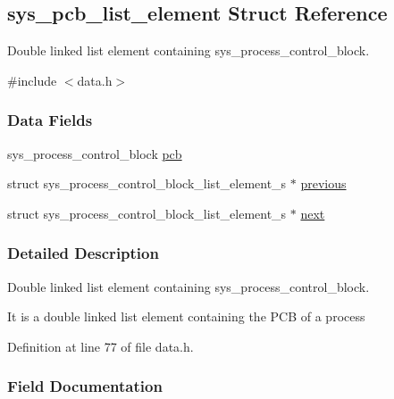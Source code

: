 \hypertarget{structsys__pcb__list__element}{}\subsection{sys\+\_\+pcb\+\_\+list\+\_\+element Struct Reference}
\label{structsys__pcb__list__element}


Double linked list element containing sys\+\_\+process\+\_\+control\+\_\+block.  




{\ttfamily \#include $<$data.\+h$>$}

\subsubsection*{Data Fields}
\begin{DoxyCompactItemize}
\item 
sys\+\_\+process\+\_\+control\+\_\+block \hyperlink{structsys__pcb__list__element_acb5a7246aa5eec849c42eafb63105088}{pcb}
\item 
struct sys\+\_\+process\+\_\+control\+\_\+block\+\_\+list\+\_\+element\+\_\+s $\ast$ \hyperlink{structsys__pcb__list__element_a15f2b704a96be29b91fc99a7c7ed6f83}{previous}
\item 
struct sys\+\_\+process\+\_\+control\+\_\+block\+\_\+list\+\_\+element\+\_\+s $\ast$ \hyperlink{structsys__pcb__list__element_a321af4d0362765c86e066b3ca4913b22}{next}
\end{DoxyCompactItemize}


\subsubsection{Detailed Description}
Double linked list element containing sys\+\_\+process\+\_\+control\+\_\+block. 

It is a double linked list element containing the P\+C\+B of a process 

Definition at line 77 of file data.\+h.



\subsubsection{Field Documentation}
\hypertarget{structsys__pcb__list__element_a321af4d0362765c86e066b3ca4913b22}{}
